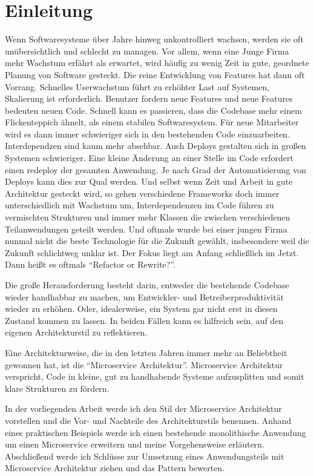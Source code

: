 \chapter{Einleitung}
Wenn Softwaresysteme über Jahre hinweg unkontrolliert wachsen, werden sie oft unübersichtlich und schlecht zu managen. Vor allem, wenn eine Junge Firma mehr Wachstum erfährt als erwartet, wird häufig zu wenig Zeit in gute, geordnete Planung von Software gesteckt. Die reine Entwicklung von Features hat dann oft Vorrang. Schnelles Userwachstum führt zu erhöhter Last auf Systemen, Skalierung ist erforderlich. Benutzer fordern neue Features und neue Features bedeuten neuen Code. Schnell kann es passieren, dass die Codebase mehr einem Flickenteppich ähnelt, als einem stabilen Softwaresystem. Für neue Mitarbeiter wird es dann immer schwieriger sich in den bestehenden Code einzuarbeiten. Interdependzen sind kaum mehr absehbar. Auch Deploys gestalten sich in großen Systemen schwieriger. Eine kleine Änderung an einer Stelle im Code erfordert einen redeploy der gesamten Anwendung. Je nach Grad der Automatisierung von Deploys kann dies zur Qual werden. Und selbst wenn Zeit und Arbeit in gute Architektur gesteckt wird, so gehen verschiedene Frameworks doch immer unterschiedlich mit Wachstum um, Interdependenzen im Code führen zu vermischten Strukturen und immer mehr Klassen die zwischen verschiedenen Teilanwendungen geteilt werden. Und oftmals wurde bei einer jungen Firma nunmal nicht die beste Technologie für die Zukunft gewählt, insbesondere weil die Zukunft schlichtweg unklar ist. Der Fokus liegt am Anfang schließlich im Jetzt. Dann heißt es oftmals ``Refactor or Rewrite?''.~\cite[vgl.][]{refactorrewrite}

Die große Herausforderung besteht darin, entweder die bestehende Codebase wieder handhabbar zu machen, um Entwickler- und Betreiberproduktivität wieder zu erhöhen. Oder, idealerweise, ein System gar nicht erst in diesen Zustand kommen zu lassen. In beiden Fällen kann es hilfreich sein, auf den eigenen Architekturstil zu reflektieren.

Eine Architekturweise, die in den letzten Jahren immer mehr an Beliebtheit gewonnen hat, ist die ``Microservice Architektur''. Microservice Architektur verspricht, Code in kleine, gut zu handhabende Systeme aufzusplitten und somit klare Strukturen zu fördern.

In der vorliegenden Arbeit werde ich den Stil der Microservice Architektur vorstellen und die Vor- und Nachteile des Architekturstils benennen. Anhand eines praktischen Beispiels werde ich einen bestehende monolithische Anwendung um einen Microservice erweitern und meine Vorgehensweise erläutern.
Abschließend werde ich Schlüsse zur Umsetzung eines Anwendungsteils mit Microservice Architektur ziehen und das Pattern bewerten.